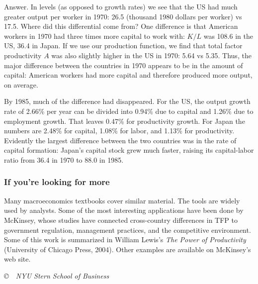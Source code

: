 \documentclass[letterpaper,12pt]{article}
\begin{document}
\begin{enumerate}
Answer.
In levels (as opposed to growth rates) we see that
the US had much greater output per worker in 1970:
26.5 (thousand 1980 dollars per worker) vs 17.5.
Where did this differential come from?  One difference is that American
workers in 1970 had three times more capital to work with:
$K/L$ was 108.6 in the US, 36.4 in Japan.  If we use our production
function, we find that total factor productivity $A$
was also slightly higher in the US in 1970:  5.64 vs 5.35.
Thus, the major difference between the countries in
1970 appears to be in the amount of capital:  American workers had more
capital and therefore produced more output, on average.

By 1985, much of the difference had disappeared.
For the US, the output growth rate of 2.66\% per year can be divided
into 0.94\% due to capital and 1.26\% due to employment growth.
That leaves 0.47\% for productivity growth.
For Japan the numbers are 2.48\% for capital, 1.08\% for
labor, and 1.13\% for productivity.
Evidently the largest difference between the two
countries was in the rate of capital formation:  Japan's capital stock
grew much faster, raising its capital-labor ratio from
36.4 in 1970 to 88.0 in 1985.

\end{enumerate}


\subsubsection*{If you're looking for more}

Many macroeconomics textbooks cover similar material.
The tools are widely used by analysts.  
Some of the most interesting applications have been done by McKinsey,
whose studies have connected cross-country differences in TFP to
government regulation, management practices,
and the competitive environment.
Some of this work is summarized in William Lewis's
{\it The Power of Productivity\/}
(University of Chicago Press, 2004).
Other examples are available on McKinsey's web site.


\vfill \centerline{\it \copyright \  \number\year \  NYU Stern
School of Business}
\end{document}
